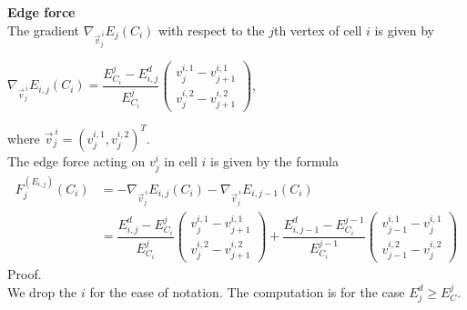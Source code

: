 \begin{proposition} \textbf{Edge force} \\
	The gradient $\nabla_{\vec{v}^{\: i}_j} E_j(C_i)$ with respect to the $j$th vertex of cell $i$ is given by 
	\begin{center}
		$\nabla_{\vec{v}^{\: i}_j} E_{i,j}(C_i) = \dfrac{E^j_{C_i} - E^d_{i,j}}{E^j_{C_i}}  \begin{pmatrix} v_{j}^{i,1} - v_{j+1}^{i,1} \\[0.5em]  v_{j}^{i,2} - v_{j+1}^{i,2} \end{pmatrix}$, 
	\end{center}
	where $\vec{v}^{\: i}_j = (v_{j}^{i,1}, v_{j}^{i,2})^T$. \\

	The edge force acting on $v_j^i$ in cell $i$ is given by the formula
	\begin{align*}
		F^{(E_{i,j})}_j(C_i) &= - \nabla_{\vec{v}^{\: i}_j} E_{i,j}(C_i) - \nabla_{\vec{v}^{\: i}_j} E_{i,j-1}(C_i) \\
		&= \dfrac{ E^d_{i,j} - E^j_{C_i}}{E^j_{C_i}}  \begin{pmatrix} v_{j}^{i,1} - v_{j+1}^{i,1} \\[0.5em]  v_{j}^{i,2} - v_{j+1}^{i,2} \end{pmatrix}
		 + \dfrac{ E^d_{i,j-1} - E^{j-1}_{C_i}}{E^{j-1}_{C_i}}  \begin{pmatrix} v_{j-1}^{i,1} - v_{j}^{i,1} \\[0.5em]  v_{j-1}^{i,2} - v_{j}^{i,2} \end{pmatrix}
	\end{align*}
	Proof. \\
	We drop the $i$ for the ease of notation. 
	The computation is for the case $E_j^d \geq E^j_C$. 


\end{proposition}
